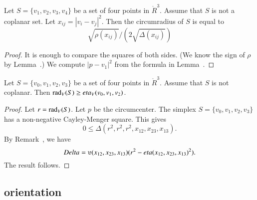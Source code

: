 \begin{tarskidata}
\begin{tarski}

\begin{lemma}
Let $S=\{v_1,v_2,v_3,v_4\}$ be a set of four points in $\ring{R}^3$.
Assume that $S$ is not a coplanar set.  
Let $x_{ij}=|v_i-v_j|^2$.
Then the circumradius of
	$S$ is equal to 
		$$
		\sqrt{\rho(x_{ij})}/
		(2\sqrt{\Delta(x_{ij})})
		$$
\end{lemma}

\begin{proof} It is enough to compare the
squares of both sides.  (We know the sign of
$\rho$ by Lemma~.)  We
compute $|p-v_1|^2$ from the formula
in Lemma~.
\end{proof}
\end{tarski}




\begin{tarski}

\begin{lemma}
Let $S=\{v_0,v_1,v_2,v_3\}$ be a set of four points in $\ring{R}^3$.
Assume that $S$ is not coplanar.
Then $\operatorname{rad}_V(S) \ge eta_V(v_0,v_1,v_2)$.
\end{lemma}

\begin{proof}  Let $r=\operatorname{rad}_V(S)$.  Let $p$ be the circumcenter.
The simplex $S=\{v_0,v_1,v_2,v_3\}$ has a non-negative 
Cayley-Menger
square.  This gives
  $$
  0\le \Delta(r^2,r^2,r^2,x_{12},x_{23},x_{13}).
  $$
By Remark~, we have
$$
\Delta = \ups(x_{12},x_{23},x_{13}) (r^2 - \eta(x_{12},x_{23},x_{13})^2).
$$
The result follows.
\end{proof}
\end{tarski}








\begin{tarski}
\subsection{orientation}


\end{tarski}
\end{tarskidata}
